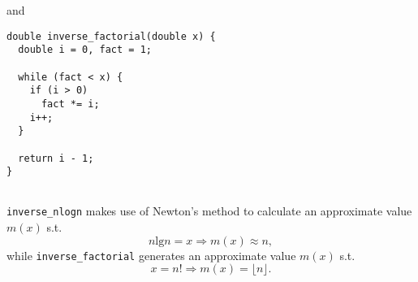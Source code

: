 and 
\begin{verbatim}
double inverse_factorial(double x) {
  double i = 0, fact = 1;

  while (fact < x) {
    if (i > 0)
      fact *= i;
    i++;
  }

  return i - 1;
}
    
\end{verbatim}
\texttt{inverse\_nlogn} makes use of Newton's method to calculate an approximate 
value $m(x)$ s.t. 
\[
    n\text{lg}n = x \Rightarrow m(x) \approx n, 
\]
while \texttt{inverse\_factorial} generates an approximate value $m(x)$ s.t. 
\[
    x = n! \Rightarrow m(x) = \lfloor n \rfloor. 
\]
